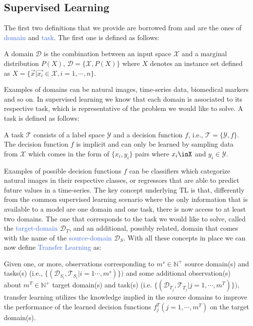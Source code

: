\subsection{Supervised Learning}
The first two definitions that we provide are borrowed from \citet{zhuang2020comprehensive} and are the ones of \textcolor{RoyalBlue}{domain} and \textcolor{RoyalBlue}{task}. The first one is defined as follows:
\begin{definition}
	A domain $\mathcal{D}$ is the combination between an input space $\mathcal{X}$ and a marginal distribution $P(X)$, $\mathcal{D} = \{\mathcal{X},P(X)\}$ where $X$ denotes an instance set defined as $X=\{\vec{x}|\vec{x_i}\in \mathcal{X}, i =1, \cdots, n \}$.
\end{definition}
Examples of domains can be natural images, time-series data, biomedical markers and so on. In supervised learning we know that each domain is associated to its respective task, which is representative of the problem we would like to solve. A task is defined as follows:
\begin{definition}
	A task $\mathcal{T}$ consists of a label space $\mathcal{Y}$ and a decision function $f$, i.e., $\mathcal{T}=\{\mathcal{Y},f\}$. The decision function $f$ is implicit and can only be learned by sampling data from $\mathcal{X}$ which comes in the form of $\{x_i,y_i\}$ pairs where $x_i\inX$ and $y_i \in \mathcal{Y}$.
\end{definition}
Examples of possible decision functions $f$ can be classifiers which categorize natural images in their respective classes, or regressors that are able to predict future values in a time-series. 
The key concept underlying TL is that, differently from the common supervised learning scenario
where the only information that is available to a model are one domain and one task, there is now access to at least two domains. The one that corresponds to the task we would like to solve, called the \textcolor{RoyalBlue}{target-domain} $\mathcal{D}_T$, and an additional, possibly related, domain that comes with the name of the \textcolor{RoyalBlue}{source-domain} $\mathcal{D}_S$. With all these concepts in place we can now define \textcolor{RoyalBlue}{Transfer Learning} as:
\begin{definition}
Given one, or more, observations corresponding to $m^s \in \mathds{N}^{+}$ source domain(s) and tasks(s) (i.e., $\{(\mathcal{D}_{S}_{i}, \mathcal{T}_{S}_{i}|i=1\cdots,m^s)\})$ and some additional observation(s) about $m^T \in \mathds{N}^{+}$ target domain(s) and task(s) (i.e. $\{(\mathcal{D}_{T}_{j},\mathcal{T}_{T}_{j}|j=1,\cdots,m^T)\})$, transfer learning utilizes the knowledge implied in the source domains to improve the performance of the learned decision functions $f^{T}_j(j=1,\cdots,m^T)$ on the target domain(s).
\end{definition}
